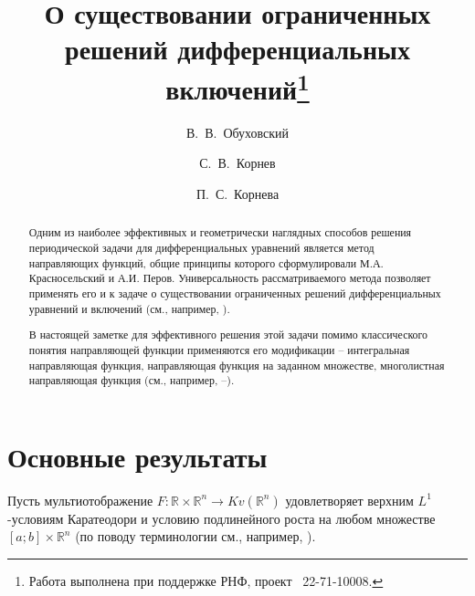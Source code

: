 \title{О существовании ограниченных решений дифференциальных включений\thanks{Работа выполнена при поддержке РНФ, проект \textnumero~22-71-10008.}}
\author{В.~В.~Обуховский \and С.~В.~Корнев  \and  П.~С.~Корнева
} %


\maketitle

\begin{abstract}
Одним из наиболее эффективных и геометрически наглядных способов решения периодической задачи для дифференциальных уравнений является метод направляющих функций, общие принципы которого сформулировали М.А. Красносельский и А.И. Перов. Универсальность рассматриваемого метода позволяет применять его и к задаче о существовании ограниченных решений дифференциальных уравнений и включений (см., например, \cite{k_kr}).

В настоящей заметке для эффективного решения этой задачи помимо классического понятия направляющей функции применяются его модификации -- интегральная направляющая функция, направляющая функция на заданном множестве, многолистная направляющая функция (см., например, \cite{k_b_g_m_o}--\cite{k_k_o_z_2}).

\end{abstract}

\section{Основные результаты} %

Пусть мультиотображение $F:\mathbb{R} \times \mathbb{R}^n \to Kv(\mathbb{R}^n)$ удовлетворяет верхним $L^1$-условиям Каратеодори и условию подлинейного роста на любом множестве $[a;b]\times \mathbb{R}^n$ (по поводу терминологии см., например, \cite{k_b_g_m_o}).


